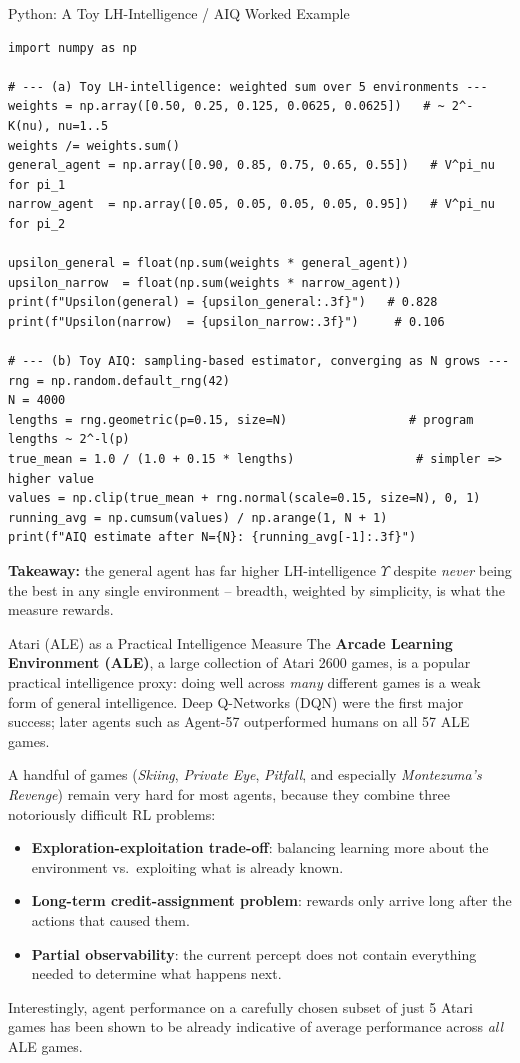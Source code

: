 \documentclass[aspectratio=169,10pt]{beamer}
\begin{document}
\begin{frame}[fragile]{Python: A Toy LH-Intelligence / AIQ Worked Example}
  \begin{lstlisting}[style=pycode]
import numpy as np

# --- (a) Toy LH-intelligence: weighted sum over 5 environments ---
weights = np.array([0.50, 0.25, 0.125, 0.0625, 0.0625])   # ~ 2^-K(nu), nu=1..5
weights /= weights.sum()
general_agent = np.array([0.90, 0.85, 0.75, 0.65, 0.55])   # V^pi_nu for pi_1
narrow_agent  = np.array([0.05, 0.05, 0.05, 0.05, 0.95])   # V^pi_nu for pi_2

upsilon_general = float(np.sum(weights * general_agent))
upsilon_narrow  = float(np.sum(weights * narrow_agent))
print(f"Upsilon(general) = {upsilon_general:.3f}")   # 0.828
print(f"Upsilon(narrow)  = {upsilon_narrow:.3f}")     # 0.106

# --- (b) Toy AIQ: sampling-based estimator, converging as N grows ---
rng = np.random.default_rng(42)
N = 4000
lengths = rng.geometric(p=0.15, size=N)                 # program lengths ~ 2^-l(p)
true_mean = 1.0 / (1.0 + 0.15 * lengths)                 # simpler => higher value
values = np.clip(true_mean + rng.normal(scale=0.15, size=N), 0, 1)
running_avg = np.cumsum(values) / np.arange(1, N + 1)
print(f"AIQ estimate after N={N}: {running_avg[-1]:.3f}")
  \end{lstlisting}
  \textbf{Takeaway:} the general agent has far higher LH-intelligence
  $\Upsilon$ despite \emph{never} being the best in any single environment
  -- breadth, weighted by simplicity, is what the measure rewards.
\end{frame}

\begin{frame}{Atari (ALE) as a Practical Intelligence Measure}
  The \textbf{Arcade Learning Environment (ALE)}, a large collection of
  Atari 2600 games, is a popular practical intelligence proxy: doing well
  across \emph{many} different games is a weak form of general
  intelligence. Deep Q-Networks (DQN) were the first major success; later
  agents such as Agent-57 outperformed humans on all 57 ALE games.

  \vspace{0.3em}
  A handful of games (\emph{Skiing}, \emph{Private Eye}, \emph{Pitfall},
  and especially \emph{Montezuma's Revenge}) remain very hard for most
  agents, because they combine three notoriously difficult RL problems:
  \begin{itemize}
    \item \textbf{Exploration-exploitation trade-off}: balancing learning
      more about the environment vs.\ exploiting what is already known.
    \item \textbf{Long-term credit-assignment problem}: rewards only arrive
      long after the actions that caused them.
    \item \textbf{Partial observability}: the current percept does not
      contain everything needed to determine what happens next.
  \end{itemize}
  Interestingly, agent performance on a carefully chosen subset of just 5
  Atari games has been shown to be already indicative of average
  performance across \emph{all} ALE games.
\end{frame}
\end{document}

